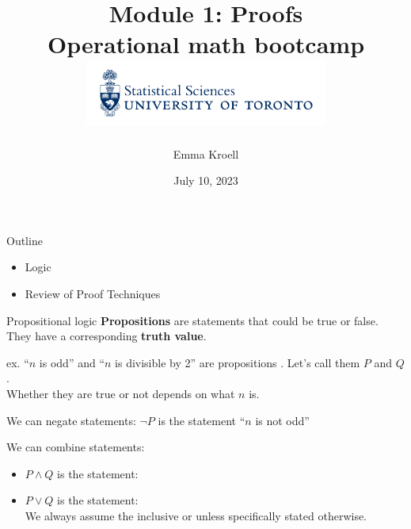 \documentclass [aspectratio=169]{beamer}
\title[]{Module 1: Proofs \\ {\large Operational math bootcamp}\\ \includegraphics[width=8cm]{dept_logo.png}\vspace{-1em}}
\author[]{Emma Kroell}
\institute[]{University of Toronto}
\date{July 10, 2023}
\begin{document}
{
\begin{frame}
    \titlepage
\end{frame}
}

\begin{frame}{Outline}
    \begin{itemize}
      \setlength\itemsep{1em}
    	\item Logic
        \item Review of Proof Techniques
    \end{itemize}
\end{frame}


\begin{frame}{Propositional logic}{}
{\bf Propositions} are statements that could be true or false. They have a corresponding {\bf truth value}. \\

\vspace{1em}

ex. ``$n$ is odd'' and ``$n$ is divisible by 2'' are propositions . Let's call them $P$ and $Q$. \\

Whether they are true or not depends on what $n$ is. \\

\vspace{1em}

We can  negate statements: $\neg P$ is the statement ``$n$ is not odd''

\vspace{1em}
 We can combine statements: 
 \begin{itemize}
 \item $P \wedge Q$ is the statement:
 \item $P \vee Q$ is the statement: \\
 We always assume the inclusive or unless specifically stated otherwise.
\end{itemize}
\end{frame}
\end{document}
